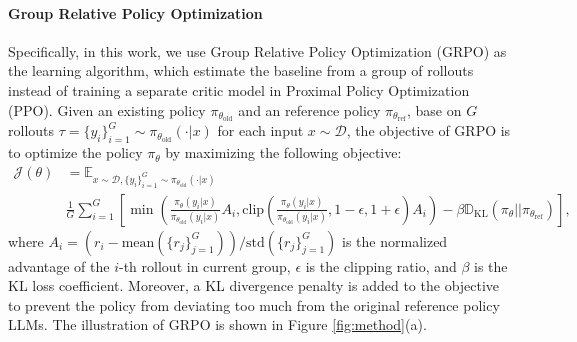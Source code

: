 \documentclass{article}
\begin{document}
\paragraph{Group Relative Policy Optimization}
Specifically, in this work, we use Group Relative Policy Optimization (GRPO) as the learning algorithm, which estimate the baseline from a group of rollouts instead of training a separate critic model in Proximal Policy Optimization (PPO).
Given an existing policy $\pi_{\theta_{\text{old}}}$ and an reference policy $\pi_{\theta_{\text{ref}}}$, base on $G$ rollouts $\tau = \{y_i\}_{i=1}^{G} \sim \pi_{\theta_{\text{old}}}(\cdot|x)$ for each input $x \sim \mathcal{D}$, the objective of GRPO is to optimize the policy $\pi_{\theta}$ by maximizing the following objective:
\begin{equation}
\begin{aligned}
\label{eq:grpo}
  \mathcal{J}(\theta) & = \mathbb{E}_{x \sim \mathcal{D}, \{y_i\}_{i=1}^{G} \sim \pi_{\theta_{\text{old}}}(\cdot|x)} \\
  & \frac{1}{G} \sum_{i=1}^{G} \left[\min \left( \frac{\pi_{\theta}(y_i|x)}{\pi_{\theta_{\text{old}}}(y_i|x)} A_{i}, \text{clip} \left( \frac{\pi_{\theta}(y_i|x)}{\pi_{\theta_{\text{old}}}(y_i|x)}, 1-\epsilon, 1+\epsilon \right) A_{i} \right) - \beta \mathbb{D}_{\text{KL}} \left( \pi_{\theta} || \pi_{\theta_{\text{ref}}} \right)\right],
\end{aligned}
\end{equation}
where $A_{i} = \left(r_i - \text{mean}(\{r_j\}_{j=1}^{G})\right) / \text{std}(\{r_j\}_{j=1}^{G})$ is the normalized advantage of the $i$-th rollout in current group, $\epsilon$ is the clipping ratio, and $\beta$ is the KL loss coefficient. 
Moreover, a KL divergence penalty is added to the objective to prevent the policy from deviating too much from the original reference policy LLMs. The illustration of GRPO is shown in Figure \ref{fig:method}(a).
\end{document}
